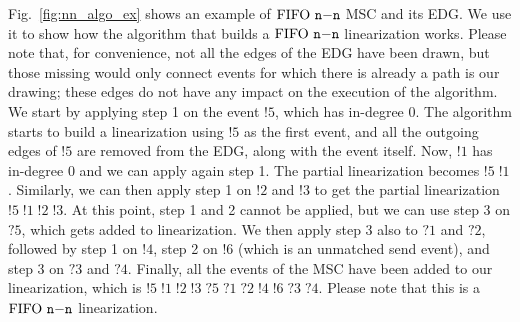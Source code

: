 \begin{example}
	Fig.~\ref{fig:nn_algo_ex} shows an example of $\text{FIFO } \mathtt{n\mathsf{-}n}$ MSC and its EDG. We use it to show how the algorithm that builds a $\text{FIFO } \mathtt{n\mathsf{-}n}$ linearization works. Please note that, for convenience, not all the edges of the EDG have been drawn, but those missing would only connect events for which there is already a path is our drawing; these edges do not have any impact on the execution of the algorithm. We start by applying step 1 on the event $!5$, which has in-degree 0. The algorithm starts to build a linearization using $!5$ as the first event, and all the outgoing edges of $!5$ are removed from the EDG, along with the event itself. Now, $!1$ has in-degree 0 and we can apply again step 1. The partial linearization becomes $!5\;!1$. Similarly, we can then apply step 1 on $!2$ and $!3$ to get the partial linearization $!5\;!1\;!2\;!3$. At this point, step 1 and 2 cannot be applied, but we can use step 3 on $?5$, which gets added to linearization. We then apply step 3 also to $?1$ and $?2$, followed by step 1 on $!4$, step 2 on $!6$ (which is an unmatched send event), and step 3 on $?3$ and $?4$. Finally, all the events of the MSC have been added to our linearization, which is $!5\;!1\;!2\;!3\;?5\;?1\;?2\;!4\;!6\;?3\;?4$. Please note that this is a $\text{FIFO } \mathtt{n\mathsf{-}n}$ linearization.
\end{example}

